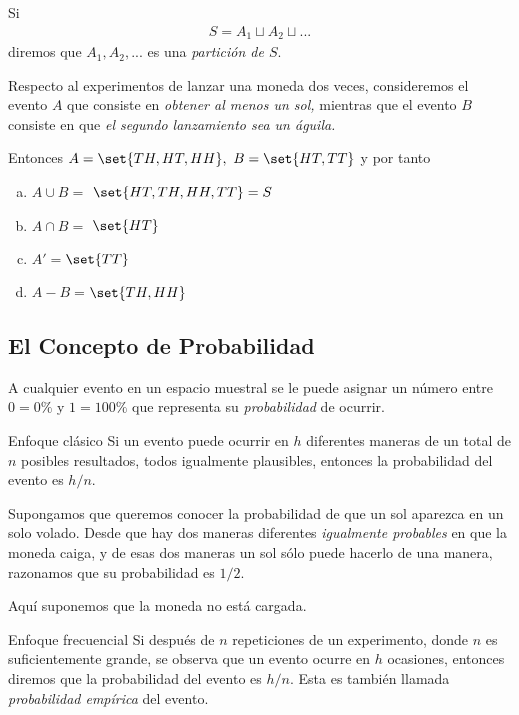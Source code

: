 Si \begin{align*}
S=A_{1}\sqcup A_{2} \sqcup ...
\end{align*}
diremos que $A_{1},A_{2},...$ es una \emph{partición de $S.$}


 \begin{exmp}
  \label{exmp:1.9}
  Respecto al experimentos de lanzar una moneda dos veces, consideremos el evento $A$ que consiste en \emph{obtener al menos un sol,}  mientras que el evento $B$ consiste en que \emph{el segundo lanzamiento sea un águila.}

  Entonces $A=\set{TH,HT,HH},$ $B=\set{HT,TT}$ y por tanto 
  \begin{enumerate}[(a)]
   \item $A\cup B =$ $\set{HT,TH,HH,TT}= S$ 
	\item $A\cap B =$ $\set{HT}$ 
	\item $A'=$$\set{TT}$
	\item $A-B=$$\set{TH,HH}$
  \end{enumerate}

 \end{exmp}


\subsection{El Concepto de Probabilidad}
{}
A cualquier evento en un espacio muestral se le puede asignar un número entre $0=0\%$ y $1=100\%$ que representa su \emph{probabilidad} de ocurrir.

{Enfoque clásico}
Si un evento puede ocurrir en $h$ diferentes maneras de un total de $n$ posibles resultados, todos igualmente plausibles, entonces la probabilidad del evento es $h/n.$


 \begin{exmp}
  \label{exmp:1.10}
  Supongamos que queremos conocer la probabilidad de que un sol aparezca en un solo volado.  Desde que hay dos maneras diferentes \emph{igualmente probables} en que la moneda caiga,  y de esas dos maneras un sol sólo puede hacerlo de una manera, razonamos que su probabilidad es $1/2.$
    

  \begin{rem}
   Aquí suponemos que la moneda no está cargada.
  \end{rem}

 \end{exmp}


{Enfoque frecuencial}
Si después de $n$ repeticiones de un experimento, donde $n$ es suficientemente grande, se observa que un evento ocurre en $h$ ocasiones, entonces diremos que la probabilidad del evento es $h/n.$  Esta es también llamada \emph{probabilidad empírica} del evento.

